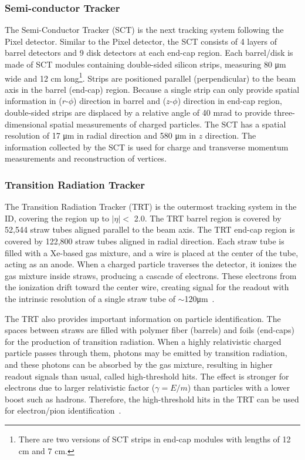 \subsubsection{Semi-conductor Tracker}
\label{sec:atlas:sct}

The Semi-Conductor Tracker (SCT) is the next tracking system following the Pixel detector. Similar to the Pixel detector, the SCT consists of 4 layers of barrel detectors and 9 disk detectors at each end-cap region. Each barrel/disk is made of SCT modules containing double-sided silicon strips, measuring 80 \si{\micro\meter} wide and 12 \si{\centi\meter} long\footnote{There are two versions of SCT strips in end-cap modules with lengths of 12 \si{cm} and 7 \si{cm}.}. Strips are positioned parallel (perpendicular) to the beam axis in the barrel (end-cap) region. Because a single strip can only provide spatial information in ($r$-$\phi$) direction in barrel and ($z$-$\phi$) direction in end-cap region, double-sided strips are displaced by a relative angle of 40 \si{\milli\radian} to provide three-dimensional spatial measurements of charged particles. The SCT has a spatial resolution of 17 \si{\micro\meter} in radial direction and 580 \si{\micro\meter} in $z$ direction. The information collected by the SCT is used for charge and transverse momentum measurements and reconstruction of vertices.


\subsubsection{Transition Radiation Tracker}
\label{sec:atlas:trt}

The Transition Radiation Tracker (TRT) is the outermost tracking system in the ID, covering the region up to $|\eta| < $ 2.0. The TRT barrel region is covered by 52,544 straw tubes aligned parallel to the beam axis. The TRT end-cap region is covered by 122,800 straw tubes aligned in radial direction. Each straw tube is filled with a Xe-based gas mixture, and a wire is placed at the center of the tube, acting as an anode. When a charged particle traverses the detector, it ionizes the gas mixture inside straws, producing a cascade of electrons. These electrons from the ionization drift toward the center wire, creating signal for the readout with the intrinsic resolution of a single straw tube of $\sim$120\si{\micro\meter}~\cite{Vogel:1537991}. 

The TRT also provides important information on particle identification. The spaces between straws are filled with polymer fiber (barrels) and foils (end-caps) for the production of transition radiation. When a highly relativistic charged particle passes through them, photons may be emitted by transition radiation, and these photons can be absorbed by the gas mixture, resulting in higher readout signals than usual, called high-threshold hits. The effect is stronger for electrons due to larger relativistic factor ($\gamma = E/m$) than particles with a lower boost such as hadrons. Therefore, the high-threshold hits in the TRT can be used for electron/pion identification~\cite{ATLAS-CONF-2011-128}.

